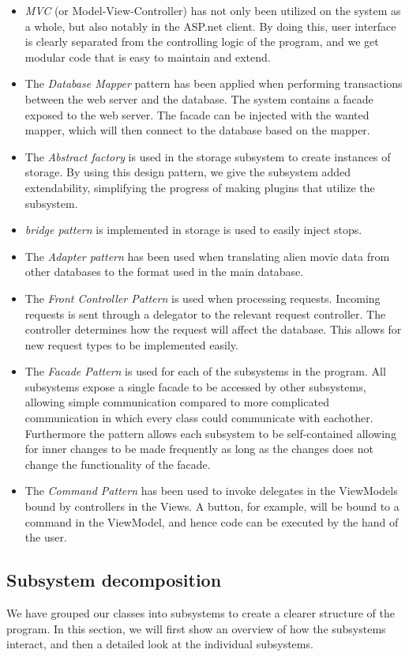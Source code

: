 \begin{itemize}
	\item \emph{MVC} (or Model-View-Controller) has not only been utilized on the system as a whole, but also notably in the ASP.net client. By doing this, user interface is clearly separated from the controlling logic of the program, and we get modular code that is easy to maintain and extend.
	\item The \emph{Database Mapper} pattern has been applied when performing transactions between the web server and the database. The system contains a facade exposed to the web server. The facade can be injected with the wanted mapper, which will then connect to the database based on the mapper.
	\item The \emph{Abstract factory} is used in the storage subsystem to create instances of storage. By using this design pattern, we give the subsystem added extendability, simplifying the progress of making plugins that utilize the subsystem.
	\item \emph{bridge pattern} is implemented  in storage is used to easily inject stops.
	\item The \emph{Adapter pattern} has been used when translating alien movie data from other databases to the format used in the main database.
	\item The \emph{Front Controller Pattern} is used when processing requests. Incoming requests is sent through a delegator to the relevant request controller. The controller determines how the request will affect the database. This allows for new request types to be implemented easily.
	\item The \emph{Facade Pattern} is used for each of the subsystems in the program. All subsystems expose a single facade to be accessed by other subsystems, allowing simple communication compared to more complicated communication in which every class could communicate with eachother. Furthermore the pattern allows each subsystem to be self-contained allowing for inner changes to be made frequently as long as the changes does not change the functionality of the facade.
	\item The \emph{Command Pattern} has been used to invoke delegates in the ViewModels bound by controllers in the Views. A button, for example, will be bound to a command in the ViewModel, and hence code can be executed by the hand of the user.
\end{itemize}

\subsection{Subsystem decomposition}
\label{sec:Subsystem decomposition}
We have grouped our classes into subsystems to create a clearer structure of the program. In this section, we will first show an overview of how the subsystems interact, and then a detailed look at the individual subsystems.\\



